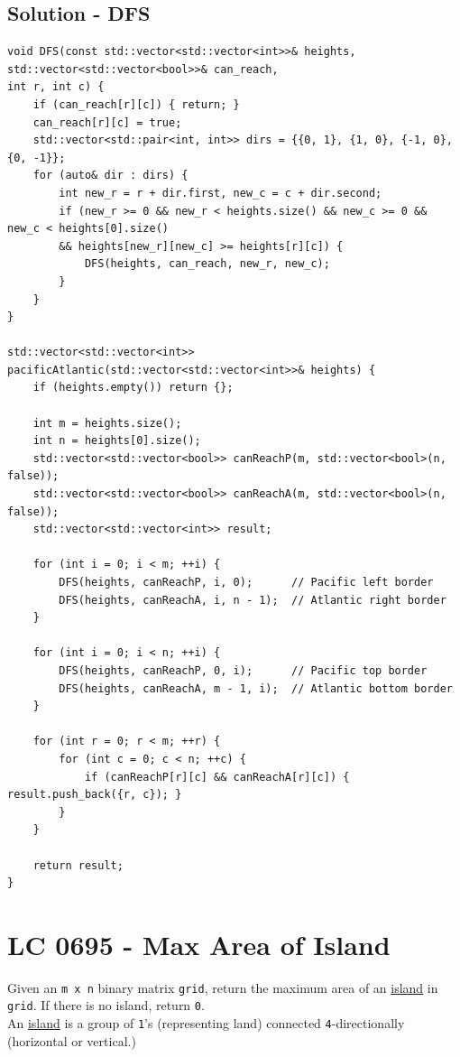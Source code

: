 \subsection*{Solution - DFS}
\begin{lstlisting}
void DFS(const std::vector<std::vector<int>>& heights, std::vector<std::vector<bool>>& can_reach,
int r, int c) {
	if (can_reach[r][c]) { return; }
	can_reach[r][c] = true;
	std::vector<std::pair<int, int>> dirs = {{0, 1}, {1, 0}, {-1, 0}, {0, -1}};
	for (auto& dir : dirs) {
		int new_r = r + dir.first, new_c = c + dir.second;
		if (new_r >= 0 && new_r < heights.size() && new_c >= 0 && new_c < heights[0].size()
		&& heights[new_r][new_c] >= heights[r][c]) {
			DFS(heights, can_reach, new_r, new_c);
		}
	}
}

std::vector<std::vector<int>> pacificAtlantic(std::vector<std::vector<int>>& heights) {
	if (heights.empty()) return {};
	
	int m = heights.size();
	int n = heights[0].size();
	std::vector<std::vector<bool>> canReachP(m, std::vector<bool>(n, false));
	std::vector<std::vector<bool>> canReachA(m, std::vector<bool>(n, false));
	std::vector<std::vector<int>> result;
	
	for (int i = 0; i < m; ++i) {
		DFS(heights, canReachP, i, 0);      // Pacific left border
		DFS(heights, canReachA, i, n - 1);  // Atlantic right border
	}
	
	for (int i = 0; i < n; ++i) {
		DFS(heights, canReachP, 0, i);      // Pacific top border
		DFS(heights, canReachA, m - 1, i);  // Atlantic bottom border
	}
	
	for (int r = 0; r < m; ++r) {
		for (int c = 0; c < n; ++c) {
			if (canReachP[r][c] && canReachA[r][c]) { result.push_back({r, c}); }
		}
	}
	
	return result;
}
\end{lstlisting}

\section{LC 0695 - Max Area of Island}
Given an {\colorbox{CodeBackground}{\lstinline|m x n|}} binary matrix {\colorbox{CodeBackground}{\lstinline|grid|}}, return the maximum area of an \ul{island} in {\colorbox{CodeBackground}{\lstinline|grid|}}. If there is no island, return {\colorbox{CodeBackground}{\lstinline|0|}}.\\


An \ul{island} is a group of {\colorbox{CodeBackground}{\lstinline|1|}}'s (representing land) connected {\colorbox{CodeBackground}{\lstinline|4|}}-directionally (horizontal or vertical.) \\

